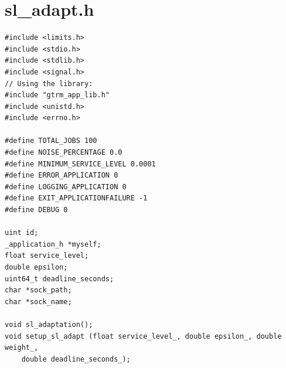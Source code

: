 \documentclass[nobiblatex]{LTHthesis}
\begin{document}
\section{sl\_adapt.h}
\begin{lstlisting}
#include <limits.h>
#include <stdio.h>
#include <stdlib.h>
#include <signal.h>
// Using the library:
#include "gtrm_app_lib.h"
#include <unistd.h>
#include <errno.h>

#define TOTAL_JOBS 100
#define NOISE_PERCENTAGE 0.0
#define MINIMUM_SERVICE_LEVEL 0.0001
#define ERROR_APPLICATION 0
#define LOGGING_APPLICATION 0
#define EXIT_APPLICATIONFAILURE -1
#define DEBUG 0

uint id;
_application_h *myself;
float service_level;
double epsilon;
uint64_t deadline_seconds;
char *sock_path;
char *sock_name;

void sl_adaptation(); 
void setup_sl_adapt (float service_level_, double epsilon_, double weight_,
    double deadline_seconds_);
\end{lstlisting}
\end{document}
